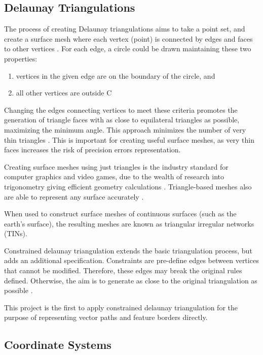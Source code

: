 \documentclass[12pt]{article}
\begin{document}
\subsection{Delaunay Triangulations}

The process of creating Delaunay triangulations aims to take a point set, and create a surface mesh where each vertex (point) is connected by edges and faces to other vertices \autocite{preparata2012computational}. For each edge, a circle could be drawn maintaining these two properties:

\begin{enumerate}[(1)]
  \item vertices in the given edge are on the boundary of the circle, and
  \item all other vertices are outside C
\end{enumerate}

Changing the edges connecting vertices to meet these criteria promotes the generation of triangle faces with as close to equilateral triangles as possible, maximizing the minimum angle. This approach minimizes the number of very thin triangles \autocite{preparata2012computational}. This is important for creating useful surface meshes, as very thin faces increases the risk of precision errors  representation.

Creating surface meshes using just triangles is the industry standard for computer graphics and video games, due to the wealth of research into trigonometry giving efficient geometry calculations \autocite{marschner2018graphics}. Triangle-based meshes also are able to represent any surface accurately \autocite{perkins2013fielddstar}.

When used to construct surface meshes of continuous surfaces (such as the earth's surface), the resulting meshes are known as triangular irregular networks (TINs).


Constrained delaunay triangulation extends the basic triangulation process, but adds an additional specification. Constraints are pre-define edges between vertices that cannot be modified. Therefore, these edges may break the original rules defined. Otherwise, the aim is to generate as close to the original triangulation as possible \autocite{chew1987constraints}.

This project is the first to apply constrained delaunay triangulation for the purpose of representing vector paths and feature borders directly.

\subsection{Coordinate Systems}
\end{document}
